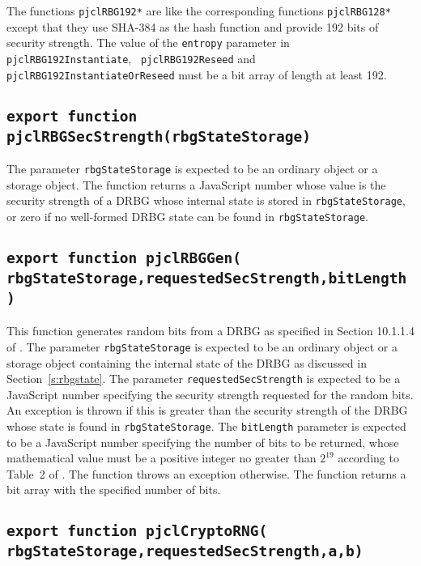 \documentclass[12pt]{article}
\begin{document}
The functions {\tt pjclRBG192*} are like the corresponding functions {\tt pjclRBG128*}
except that they use SHA-384 as the hash function
and provide 192 bits of security strength.  The value of
the {\tt entropy} parameter in {\tt pjclRBG192Instantiate}, {\tt
  pjclRBG192Reseed} and\\
{\tt pjclRBG192InstantiateOrReseed} must be a
bit array of length at least 192.

\subsection{\tt export function pjclRBGSecStrength(rbgStateStorage)}

The parameter {\tt rbgStateStorage} is expected to be an ordinary
object or a storage object.  The function
returns a JavaScript number whose value is the security strength
of a DRBG whose internal state is stored in {\tt rbgStateStorage},
or zero if no well-formed DRBG state can be found in {\tt rbgStateStorage}.

\subsection{\tt export function pjclRBGGen(\\\mbox{}\hspace{.2in}rbgStateStorage,requestedSecStrength,bitLength)}

This function generates random bits from a DRBG as
specified in Section 10.1.1.4 of \cite{SP800-90Ar1}.
The parameter {\tt rbgStateStorage} is expected to be an ordinary
object or a storage object containing the internal state of the DRBG 
as discussed in Section~\ref{s:rbgstate}.
The parameter {\tt requestedSecStrength} is expected to be a
JavaScript number specifying the security strength requested for
the random bits.  An exception is thrown if this is greater
than the security strength of the DRBG whose state is found in 
{\tt rbgStateStorage}.
The {\tt bitLength} parameter is expected to be a JavaScript number
specifying the number of bits to be returned, whose mathematical value must be a positive integer no greater
than $2^{19}$ according to Table~2 of \cite{SP800-90Ar1}.  The
function throws an exception otherwise.
The function returns a bit array with the specified number of bits.

\subsection{\tt export function pjclCryptoRNG(\\\mbox{}\hspace{.2in}rbgStateStorage,requestedSecStrength,a,b)}
\end{document}
